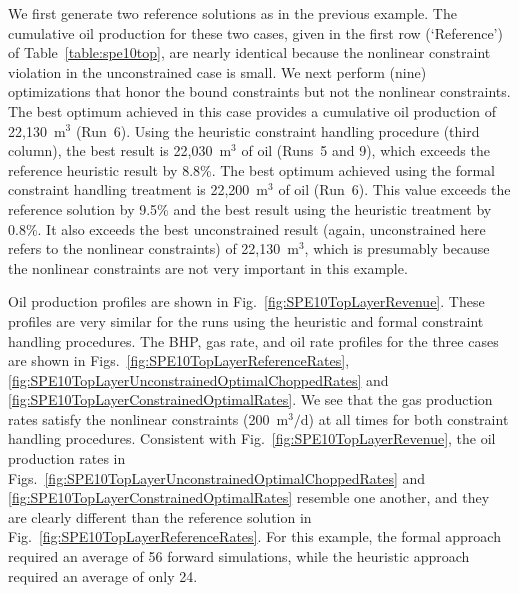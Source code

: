 We first generate two reference solutions as in the previous example. The cumulative oil production for these two cases, given in the first row (`Reference') of Table~\ref{table:spe10top}, are nearly identical because the nonlinear constraint violation in the
unconstrained case is small. We next perform (nine) optimizations that honor the bound constraints but not the nonlinear constraints. The best optimum achieved in this case provides a cumulative oil production of 22,130~m$^3$ (Run~6). Using the heuristic constraint handling procedure (third column), the best result is 22,030~m$^3$ of oil (Runs~5 and 9), which
exceeds the reference heuristic result by 8.8\%. The best optimum achieved using the formal constraint handling treatment is 22,200~m$^3$ of oil (Run~6). This value exceeds the reference solution by 9.5\% and the best result using the heuristic treatment by 0.8\%. It also exceeds the best unconstrained result (again, unconstrained here refers to the nonlinear constraints) of 22,130~m$^3$, which is presumably because the nonlinear constraints are not very important in this example.

Oil production profiles are shown in Fig.~\ref{fig:SPE10TopLayerRevenue}. These profiles are very similar for the runs using the heuristic and formal constraint handling procedures. The BHP, gas rate, and oil rate profiles for the three cases are shown in
Figs.~\ref{fig:SPE10TopLayerReferenceRates},
\ref{fig:SPE10TopLayerUnconstrainedOptimalChoppedRates} and
\ref{fig:SPE10TopLayerConstrainedOptimalRates}. We see that the gas production rates satisfy the nonlinear constraints (200~m$^3/$d) at all times for both constraint handling procedures. Consistent with Fig.~\ref{fig:SPE10TopLayerRevenue}, the oil production rates in Figs.~\ref{fig:SPE10TopLayerUnconstrainedOptimalChoppedRates} and
\ref{fig:SPE10TopLayerConstrainedOptimalRates} resemble one another, and they are clearly different than the reference solution in Fig.~\ref{fig:SPE10TopLayerReferenceRates}. 
For this example, the formal approach required an average of 56 forward simulations, while the heuristic approach required an average of only 24.


